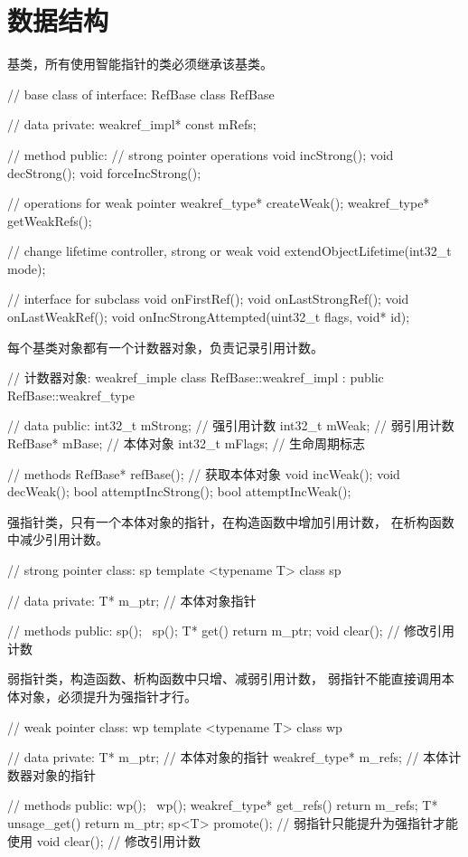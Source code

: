 \documentclass[a4paper,11pt]{article}
\begin{document}
\section[数据结构]{数据结构}
基类，所有使用智能指针的类必须继承该基类。

\begin{cppcode}
// base class of interface: RefBase
class RefBase {
// data
private:
    weakref_impl* const mRefs;

// method
public:
    // strong pointer operations
    void incStrong();
    void decStrong();
    void forceIncStrong();

    // operations for weak pointer
    weakref_type* createWeak();
    weakref_type* getWeakRefs();

    // change lifetime controller, strong or weak
    void extendObjectLifetime(int32_t mode);

    // interface for subclass
    void onFirstRef();
    void onLastStrongRef();
    void onLastWeakRef();
    void onIncStrongAttempted(uint32_t flags, void* id);
}
\end{cppcode}

每个基类对象都有一个计数器对象，负责记录引用计数。

\begin{cppcode}
// 计数器对象: weakref_imple
class RefBase::weakref_impl : public RefBase::weakref_type {
// data
public:
    int32_t mStrong; // 强引用计数
    int32_t mWeak;   // 弱引用计数
    RefBase* mBase;  // 本体对象
    int32_t mFlags;  // 生命周期标志

// methods
    RefBase* refBase();  // 获取本体对象
    void incWeak();
    void decWeak();
    bool attemptIncStrong();
    bool attemptIncWeak();
}
\end{cppcode}

强指针类，只有一个本体对象的指针，在构造函数中增加引用计数，
在析构函数中减少引用计数。

\begin{cppcode}
// strong pointer class: sp
template <typename T>
class sp {
// data
private:
    T* m_ptr;  // 本体对象指针

// methods
public:
    sp();
    ~sp();
    T* get() { return m_ptr; }
    void clear();  // 修改引用计数
}
\end{cppcode}

弱指针类，构造函数、析构函数中只增、减弱引用计数，
弱指针不能直接调用本体对象，必须提升为强指针才行。

\begin{cppcode}
// weak pointer class: wp
template <typename T>
class wp {
// data
private:
    T* m_ptr;  // 本体对象的指针
    weakref_type* m_refs;  // 本体计数器对象的指针

// methods
public:
    wp();
    ~wp();
    weakref_type* get_refs() { return m_refs; }
    T* unsage_get() { return m_ptr; }
    sp<T> promote();  // 弱指针只能提升为强指针才能使用
    void clear();  // 修改引用计数
}
\end{cppcode}
\end{document}
